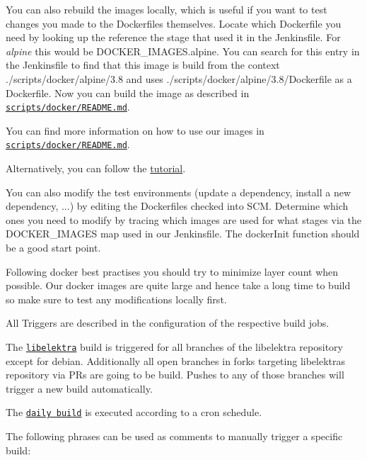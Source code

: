 You can also rebuild the images locally, which is useful if you want to test changes you made to the Dockerfiles themselves. Locate which Dockerfile you need by looking up the reference the stage that used it in the Jenkinsfile. For {\itshape alpine} this would be {\ttfamily D\+O\+C\+K\+E\+R\+\_\+\+I\+M\+A\+G\+E\+S.\+alpine}. You can search for this entry in the Jenkinsfile to find that this image is build from the context {\ttfamily ./scripts/docker/alpine/3.8} and uses {\ttfamily ./scripts/docker/alpine/3.8/\+Dockerfile} as a Dockerfile. Now you can build the image as described in \href{https://master.libelektra.org/scripts/docker/README.md#building-images-locally}{\tt scripts/docker/\+R\+E\+A\+D\+M\+E.\+md}.

You can find more information on how to use our images in \href{https://master.libelektra.org/scripts/docker/README.md#testing-elektra-via-docker-images}{\tt scripts/docker/\+R\+E\+A\+D\+M\+E.\+md}.

Alternatively, you can follow the \hyperlink{doc_tutorials_run_all_tests_with_docker_md}{tutorial}.

You can also modify the test environments (update a dependency, install a new dependency, ...) by editing the Dockerfiles checked into S\+CM. Determine which ones you need to modify by tracing which images are used for what stages via the {\ttfamily D\+O\+C\+K\+E\+R\+\_\+\+I\+M\+A\+G\+ES} map used in our Jenkinsfile. The {\ttfamily docker\+Init} function should be a good start point.

Following docker best practises you should try to minimize layer count when possible. Our docker images are quite large and hence take a long time to build so make sure to test any modifications locally first.

All Triggers are described in the configuration of the respective build jobs.

The \href{https://build.libelektra.org/job/libelektra/}{\tt libelektra} build is triggered for all branches of the libelektra repository except for {\ttfamily debian}. Additionally all open branches in forks targeting libelektra\textquotesingle{}s repository via P\+Rs are going to be build. Pushes to any of those branches will trigger a new build automatically.

The \href{https://build.libelektra.org/job/libelektra-daily/}{\tt daily build} is executed according to a cron schedule.

The following phrases can be used as comments to manually trigger a specific build\+:


